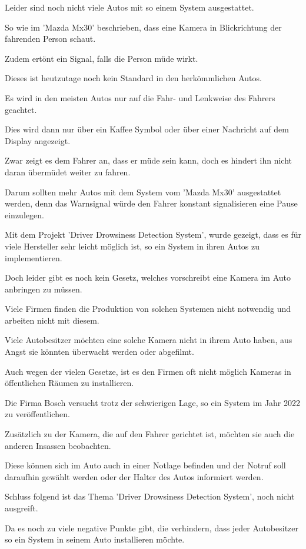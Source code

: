 Leider sind noch nicht viele Autos mit so einem System ausgestattet.

So wie im 'Mazda Mx30' beschrieben, dass eine Kamera in Blickrichtung der fahrenden Person schaut. 

Zudem ertönt ein Signal, falls die Person müde wirkt.
 
Dieses ist heutzutage noch kein Standard in den herkömmlichen Autos. 

Es wird in den meisten Autos nur auf die Fahr- und Lenkweise des Fahrers geachtet. 

Dies wird dann nur über ein Kaffee Symbol oder über einer Nachricht auf dem Display angezeigt.

Zwar zeigt es dem Fahrer an, dass er müde sein kann, doch es hindert ihn nicht daran übermüdet weiter zu fahren.

Darum sollten mehr Autos mit dem System vom 'Mazda Mx30' ausgestattet werden, denn das Warnsignal würde den Fahrer konstant signalisieren eine Pause einzulegen.

Mit dem Projekt 'Driver Drowsiness Detection System', wurde gezeigt, dass es für viele Hersteller sehr leicht möglich ist, so ein System in ihren Autos zu implementieren.

Doch leider gibt es noch kein Gesetz, welches vorschreibt eine Kamera im Auto anbringen zu müssen.

Viele Firmen finden die Produktion von solchen Systemen nicht notwendig und arbeiten nicht mit diesem.

Viele Autobesitzer möchten eine solche Kamera nicht in ihrem Auto haben, aus Angst sie könnten überwacht werden oder abgefilmt.

Auch wegen der vielen Gesetze, ist es den Firmen oft nicht möglich Kameras in öffentlichen Räumen zu installieren.

Die Firma Bosch versucht trotz der schwierigen Lage, so ein System im Jahr 2022 zu veröffentlichen.

Zusätzlich zu der Kamera, die auf den Fahrer gerichtet ist, möchten sie auch die anderen Insassen beobachten.

Diese können sich im Auto auch in einer Notlage befinden und der Notruf soll daraufhin gewählt werden oder der Halter des Autos informiert werden.


Schluss folgend ist das Thema 'Driver Drowsiness Detection System', noch nicht ausgreift. 

Da es noch zu viele negative Punkte gibt, die verhindern, dass jeder Autobesitzer so ein System in seinem Auto installieren möchte.\cite{b7}








